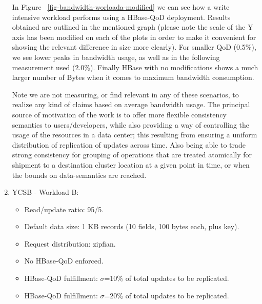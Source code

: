 \begin{enumerate}
In Figure ~\ref{fig-bandwidth-worloada-modified} we can see how a write intensive workload performs using a HBase-QoD deployment. Results obtained are outlined in the mentioned graph (please note the scale of the Y axis has been modified on each of the plots in order to make it convenient for showing the relevant difference in size more clearly).
  For smaller QoD (0.5\%), we see lower peaks in bandwidth usage, as well as in the following measurement used (2.0\%). Finally HBase with no modifications shows a much larger number of Bytes when it comes to maximum bandwidth consumption.

Note we are not measuring, or find relevant in any of these scenarios, to realize any kind of claims based on average bandwidth usage. The principal source of motivation of the work is to offer more flexible consistency semantics to users/developers, while also providing a way of controlling the usage of the resources in a data center; this resulting from  ensuring a uniform distribution of replication of updates across time. Also being able to trade strong consistency for grouping of operations that are treated atomically for shipment to a destination cluster location at a given point in time, or when the bounds on data-semantics are reached.\\


\item{YCSB - Workload B:}
\begin{itemize}
	\item Read/update ratio: 95/5.
	\item Default data size: 1 KB records (10 fields, 100 bytes each, plus key).
	\item Request distribution: zipfian.
	\item No HBase-QoD enforced.
	\item HBase-QoD fulfillment: $\sigma$=10\% of total updates to be replicated.
	\item HBase-QoD fulfillment: $\sigma$=20\% of total updates to be replicated.
\end{itemize}
	

\end{enumerate}
